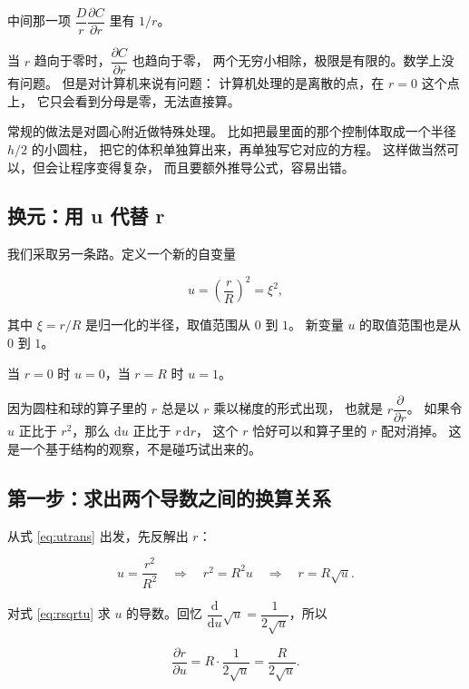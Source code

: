 中间那一项 $\dfrac{D}{r}\dfrac{\partial C}{\partial r}$ 里有 $1/r$。

当 $r$ 趋向于零时，$\dfrac{\partial C}{\partial r}$ 也趋向于零，
两个无穷小相除，极限是有限的。数学上没有问题。
但是对计算机来说有问题：
计算机处理的是离散的点，在 $r=0$ 这个点上，
它只会看到分母是零，无法直接算。

常规的做法是对圆心附近做特殊处理。
比如把最里面的那个控制体取成一个半径 $h/2$ 的小圆柱，
把它的体积单独算出来，再单独写它对应的方程。
这样做当然可以，但会让程序变得复杂，
而且要额外推导公式，容易出错。

\subsection{换元：用 u 代替 r}

我们采取另一条路。定义一个新的自变量

\begin{equation}
u = \left(\frac{r}{R}\right)^2 = \xi^2,
\label{eq:utrans}
\end{equation}

其中 $\xi=r/R$ 是归一化的半径，取值范围从 $0$ 到 $1$。
新变量 $u$ 的取值范围也是从 $0$ 到 $1$。

当 $r=0$ 时 $u=0$，当 $r=R$ 时 $u=1$。

因为圆柱和球的算子里的 $r$ 总是以 $r$ 乘以梯度的形式出现，
也就是 $r\dfrac{\partial}{\partial r}$。
如果令 $u$ 正比于 $r^2$，那么 $\mathrm{d}u$ 正比于 $r\,\mathrm{d}r$，
这个 $r$ 恰好可以和算子里的 $r$ 配对消掉。
这是一个基于结构的观察，不是碰巧试出来的。

\subsection{第一步：求出两个导数之间的换算关系}

从式 \eqref{eq:utrans} 出发，先反解出 $r$：

\begin{equation}
u = \frac{r^2}{R^2}
\quad\Longrightarrow\quad
r^2 = R^2 u
\quad\Longrightarrow\quad
r = R\sqrt{u}.
\label{eq:rsqrtu}
\end{equation}

对式 \eqref{eq:rsqrtu} 求 $u$ 的导数。回忆 $\dfrac{\mathrm{d}}{\mathrm{d}u}\sqrt{u}
= \dfrac{1}{2\sqrt{u}}$，所以

\begin{equation}
\frac{\partial r}{\partial u} = R\cdot\frac{1}{2\sqrt{u}} = \frac{R}{2\sqrt{u}}.
\label{eq:drdu}
\end{equation}

